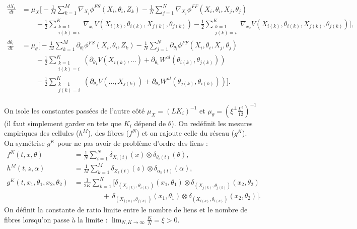 \documentclass{article}
\begin{document}
\begin{subequations}
\label{eq:micro_fibres_xi}
\begin{align}
\frac{dX_i}{dt} &= \mu_X \Bigg[ -\frac{1}{M}\sum_{k=1}^M \nabla_{X_i}\phi^{FS}(X_i, \theta_i, Z_k) - \frac{1}{N}\sum_{j=1}^N \nabla_{X_i}\phi^{FF}(X_i, \theta_i, X_j, \theta_j) \nonumber \\
&\qquad - \frac{1}{2}\sum_{\substack{k=1 \\ i(k)=i}}^K \nabla_{x_1}V(X_{i(k)}, \theta_{i(k)}, X_{j(k)}, \theta_{j(k)}) - \frac{1}{2}\sum_{\substack{k=1 \\ j(k)=i}}^K \nabla_{x_2}V(X_{i(k)}, \theta_{i(k)}, X_{j(k)}, \theta_{j(k)}) \Bigg], \tag{2a} \\
\frac{d\theta_i}{dt} &= \mu_\theta \Bigg[ -\frac{1}{M}\sum_{k=1}^M \partial_{\theta_i}\phi^{FS}(X_i, \theta_i, Z_k) - \frac{1}{N}\sum_{j=1}^N \partial_{\theta_i}\phi^{FF}(X_i, \theta_i, X_j, \theta_j) \nonumber \\
&\qquad - \frac{1}{2}\sum_{\substack{k=1 \\ i(k)=i}}^K \left(\partial_{\theta_1}V(X_{i(k)}, \dots) + \partial_{\theta_1}W^{al}(\theta_{i(k)}, \theta_{j(k)})\right) \nonumber \\
&\qquad - \frac{1}{2}\sum_{\substack{k=1 \\ j(k)=i}}^K \left(\partial_{\theta_2}V(\dots, X_{j(k)}) + \partial_{\theta_2}W^{al}(\theta_{j(k)}, \theta_{i(k)})\right) \Bigg]. \tag{2b}
\end{align}
\end{subequations}

On isole les constantes passées de l'autre côté $\mu_X = (LK_i)^{-1}$ et $\mu_\theta = \left(\xi^\perp \frac{L^3}{12}\right)^{-1}$ (il faut simplement garder en tete que $K_i$ dépend de $\theta$). On redéfinit les mesures empiriques des cellules ($h^M$), des fibres ($f^N$) et on rajoute celle du réseau ($g^K$). On symétrise $g^K$ pour ne pas avoir de problème d'ordre des liens :
\begin{align*}
f^N(t, x, \theta) &= \frac{1}{N} \sum_{i=1}^N \delta_{X_i(t)}(x) \otimes \delta_{\theta_i(t)}(\theta), \\
h^M(t, z, \alpha) &= \frac{1}{M} \sum_{k=1}^M \delta_{Z_k(t)}(z) \otimes \delta_{\alpha_k(t)}(\alpha), \\
g^K(t, x_1, \theta_1, x_2, \theta_2) &= \frac{1}{2K} \sum_{k=1}^K \Big[ \delta_{(X_{i(k)}, \theta_{i(k)})}(x_1, \theta_1) \otimes \delta_{(X_{j(k)}, \theta_{j(k)})}(x_2, \theta_2) \\
&\qquad\qquad + \, \delta_{(X_{j(k)}, \theta_{j(k)})}(x_1, \theta_1) \otimes \delta_{(X_{i(k)}, \theta_{i(k)})}(x_2, \theta_2) \Big].
\end{align*}
On définit la constante de ratio limite entre le nombre de liens et le nombre de fibres lorsqu'on passe à la limite : $\lim_{N, K \to \infty} \frac{K}{N} = \xi > 0$.
\end{document}
